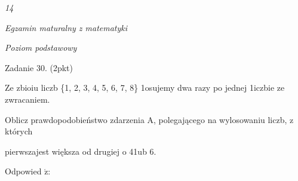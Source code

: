 \documentclass[a4paper,12pt]{article}
\begin{document}
{\it 14}

{\it Egzamin maturalny z matematyki}

{\it Poziom podstawowy}

Zadanie 30. (2pkt)

Ze zbioiu liczb \{1, 2, 3, 4, 5, 6, 7, 8\} 1osujemy dwa razy po jednej 1iczbie ze zwracaniem.

Oblicz prawdopodobieństwo zdarzenia A, polegającego na wylosowaniu liczb, z których

pierwszajest większa od drugiej o 41ub 6.

Odpowied $\acute{\mathrm{z}}$:
\end{document}
